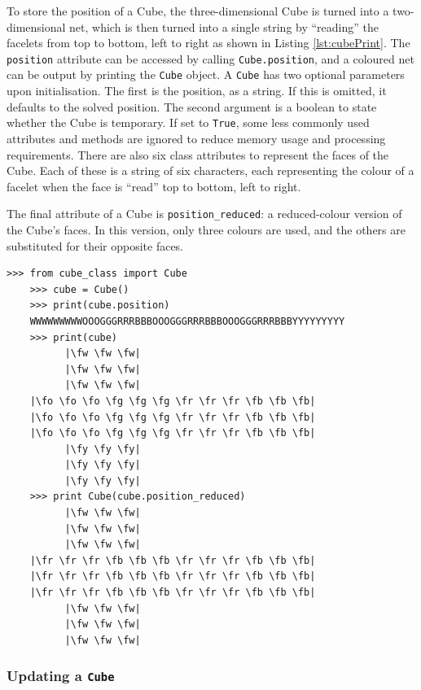 \documentclass{report}
\newcommand{\fw}{\color{gray}W }
\newcommand{\fo}{\color{orange}O }
\newcommand{\fg}{\color{green}G }
\newcommand{\fr}{\color{red}R }
\newcommand{\fb}{\color{blue}B }
\newcommand{\fy}{\color{yellow}Y }
\begin{document}
    To store the position of a Cube, the three-dimensional Cube is turned into a two-dimensional net, which is then turned into a single string by \enquote{reading} the facelets from top to bottom, left to right as shown in Listing \ref{lst:cubePrint}. The \lstinline|position| attribute can be accessed by calling \lstinline|Cube.position|, and a coloured net can be output by printing the \lstinline|Cube| object. A \lstinline|Cube| has two optional parameters upon initialisation. The first is the position, as a string. If this is omitted, it defaults to the solved position. The second argument is a boolean to state whether the Cube is temporary. If set to \lstinline|True|, some less commonly used attributes and methods are ignored to reduce memory usage and processing requirements. There are also six class attributes to represent the faces of the Cube. Each of these is a string of six characters, each representing the colour of a facelet when the face is \enquote{read} top to bottom, left to right.
    
    The final attribute of a Cube is \lstinline|position_reduced|: a reduced-colour version of the Cube's faces. In this version, only three colours are used, and the others are substituted for their opposite faces.
    
	\begin{lstlisting}[caption={The two different ways of accessing a Cube's position}, label={lst:cubePrint}]
    >>> from cube_class import Cube
    >>> cube = Cube()
    >>> print(cube.position)
    WWWWWWWWWOOOGGGRRRBBBOOOGGGRRRBBBOOOGGGRRRBBBYYYYYYYYY
    >>> print(cube)
          |\fw \fw \fw|
          |\fw \fw \fw|
          |\fw \fw \fw|
    |\fo \fo \fo \fg \fg \fg \fr \fr \fr \fb \fb \fb|
    |\fo \fo \fo \fg \fg \fg \fr \fr \fr \fb \fb \fb|
    |\fo \fo \fo \fg \fg \fg \fr \fr \fr \fb \fb \fb|
          |\fy \fy \fy|
          |\fy \fy \fy|
          |\fy \fy \fy|
	>>> print Cube(cube.position_reduced)
	      |\fw \fw \fw|
	      |\fw \fw \fw|
	      |\fw \fw \fw|
	|\fr \fr \fr \fb \fb \fb \fr \fr \fr \fb \fb \fb|
	|\fr \fr \fr \fb \fb \fb \fr \fr \fr \fb \fb \fb|
	|\fr \fr \fr \fb \fb \fb \fr \fr \fr \fb \fb \fb|
	      |\fw \fw \fw|
	      |\fw \fw \fw|
	      |\fw \fw \fw|\end{lstlisting}
    
    \subsubsection{Updating a \lstinline|Cube|}
    
\end{document}
